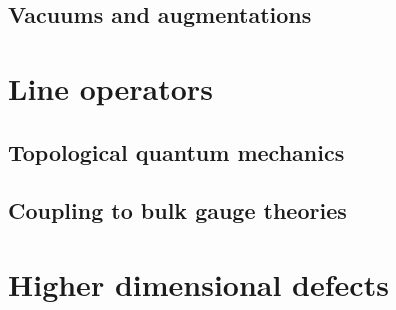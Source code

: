 \documentclass[11pt]{amsart}
\begin{document}
\subsection{Vacuums and augmentations}

\section{Line operators}


\subsection{Topological quantum mechanics}

\subsection{Coupling to bulk gauge theories}

\section{Higher dimensional defects} 

\end{document}
